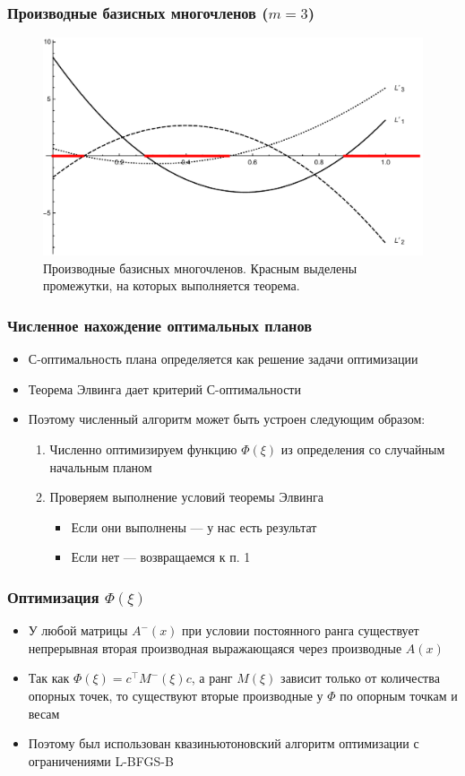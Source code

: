 \documentclass[unicode, notheorems, minimal, nologo]{beamer}
\begin{document}
\begin{frame}
	\frametitle{Производные базисных многочленов ($m = 3$)}
	\begin{figure}
		\includegraphics[width=\textwidth]{fig/dl_color.pdf}
		\caption{Производные базисных многочленов. Красным выделены промежутки, на которых выполняется теорема.}
	\end{figure}
\end{frame}

\begin{frame}
	\frametitle{Численное нахождение оптимальных планов}
	\begin{itemize}
		\item С-оптимальность плана определяется как решение задачи оптимизации
		\item Теорема Элвинга дает критерий С-оптимальности
		\item Поэтому численный алгоритм может быть устроен следующим образом:
		\begin{enumerate}
			\item Численно оптимизируем функцию $\Phi(\xi)$ из определения со случайным начальным планом
			\item Проверяем выполнение условий теоремы Элвинга
			\begin{itemize}
				\item Если они выполнены --- у нас есть результат
				\item Если нет --- возвращаемся к п. 1
			\end{itemize}
		\end{enumerate}
	\end{itemize}
\end{frame}

\begin{frame}
	\frametitle {Оптимизация $\Phi(\xi)$}
	\begin{itemize}
		\item У любой матрицы $A^-(x)$ при условии постоянного ранга существует непрерывная вторая производная выражающаяся через производные $A(x)$
		\item Так как $\Phi(\xi) = c^\top M^-(\xi) c$, а ранг $M(\xi)$ зависит только от количества опорных точек, то существуют вторые производные у $\Phi$ по опорным точкам и весам
		\item Поэтому был использован квазиньютоновский алгоритм оптимизации с ограничениями L-BFGS-B 
	\end{itemize}
\end{frame}
\end{document}
